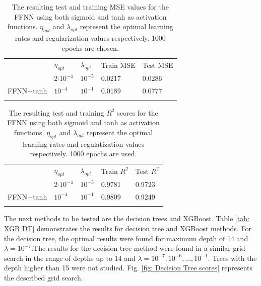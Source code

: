 \documentclass[numberedappendix, twocolappendix]{emulateapj}
\begin{document}
\begin{table}[!htb]
\begin{center}
\caption{The resulting test and training MSE values for the FFNN using both sigmoid and tanh as activation functions. $\eta_{opt}$ and $\lambda_{opt}$ represent the optimal learning rates and regularization values respectively. 1000 epochs are chosen.}
\label{tab:FFNN MSE}  
\begin{tabular}{lllll}
\cline{2-5}\noalign{\smallskip}\cline{2-5}\noalign{\smallskip} 
& $\eta_{opt}$ & $\lambda_{opt}$ &  Train MSE & Test MSE \\ \noalign{\smallskip}\hline\noalign{\smallskip} \hline\noalign{\smallskip}
\multicolumn{1}{l|}{FFNN+sigmoid} & 2$\cdot10^{-4}$ & $10^{-5}$ & 0.0217 & 0.0286\\
\multicolumn{1}{l|}{FFNN+tanh} & $10^{-4}$ & $10^{-1}$ & 0.0189 & 0.0777\\
\noalign{\smallskip}\hline
\end{tabular}
\end{center}
\end{table}


\begin{table}[!htb]
\begin{center}
\caption{The resulting test and training $R^2$ scores for the FFNN using both sigmoid and tanh as activation functions. $\eta_{opt}$ and $\lambda_{opt}$ represent the optimal learning rates and regulatization values respectively. 1000 epochs are used.}
\label{tab:FFNN R2}
\begin{tabular}{lllll}
\cline{2-5}\noalign{\smallskip}\cline{2-5}\noalign{\smallskip} 
& $\eta_{opt}$ & $\lambda_{opt}$ &  Train $R^2$ & Test $R^2$ \\ \noalign{\smallskip}\hline\noalign{\smallskip} \hline\noalign{\smallskip}
\multicolumn{1}{l|}{FFNN+sigmoid} & 2$\cdot10^{-4}$ & $10^{-5}$ & 0.9781 & 0.9723\\
\multicolumn{1}{l|}{FFNN+tanh} & $10^{-4}$ & $10^{-1}$ & 0.9809 & 0.9249\\
\noalign{\smallskip}\hline
\end{tabular}
\end{center}
\end{table}

The next methods to be tested are the decision trees and XGBoost. Table \ref{tab: XGB DT} demonstrates the results for decision tree and XGBoost methods. For the decision tree, the optimal results were found for maximum depth of 14 and $\lambda = 10^{-7}$.The results for the decision tree method were found in a similar grid search in the range of depths up to 14 and $\lambda=10^{-7}, 10^{-6}, ..., 10^{-1}$. Trees with the depth higher than 15 were not studied. Fig. \ref{fig: Decision Tree scores} represents the described grid search.
\end{document}
